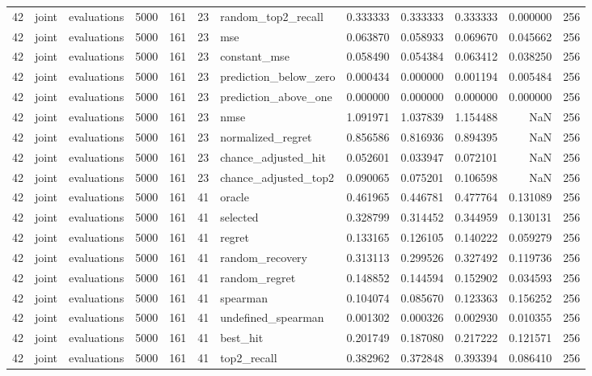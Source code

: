 \begin{tabular}{rllrrrlrrrrr}
42 & joint & evaluations & 5000 & 161 & 23 & random_top2_recall & 0.333333 & 0.333333 & 0.333333 & 0.000000 & 256 \\
42 & joint & evaluations & 5000 & 161 & 23 & mse & 0.063870 & 0.058933 & 0.069670 & 0.045662 & 256 \\
42 & joint & evaluations & 5000 & 161 & 23 & constant_mse & 0.058490 & 0.054384 & 0.063412 & 0.038250 & 256 \\
42 & joint & evaluations & 5000 & 161 & 23 & prediction_below_zero & 0.000434 & 0.000000 & 0.001194 & 0.005484 & 256 \\
42 & joint & evaluations & 5000 & 161 & 23 & prediction_above_one & 0.000000 & 0.000000 & 0.000000 & 0.000000 & 256 \\
42 & joint & evaluations & 5000 & 161 & 23 & nmse & 1.091971 & 1.037839 & 1.154488 & NaN & 256 \\
42 & joint & evaluations & 5000 & 161 & 23 & normalized_regret & 0.856586 & 0.816936 & 0.894395 & NaN & 256 \\
42 & joint & evaluations & 5000 & 161 & 23 & chance_adjusted_hit & 0.052601 & 0.033947 & 0.072101 & NaN & 256 \\
42 & joint & evaluations & 5000 & 161 & 23 & chance_adjusted_top2 & 0.090065 & 0.075201 & 0.106598 & NaN & 256 \\
42 & joint & evaluations & 5000 & 161 & 41 & oracle & 0.461965 & 0.446781 & 0.477764 & 0.131089 & 256 \\
42 & joint & evaluations & 5000 & 161 & 41 & selected & 0.328799 & 0.314452 & 0.344959 & 0.130131 & 256 \\
42 & joint & evaluations & 5000 & 161 & 41 & regret & 0.133165 & 0.126105 & 0.140222 & 0.059279 & 256 \\
42 & joint & evaluations & 5000 & 161 & 41 & random_recovery & 0.313113 & 0.299526 & 0.327492 & 0.119736 & 256 \\
42 & joint & evaluations & 5000 & 161 & 41 & random_regret & 0.148852 & 0.144594 & 0.152902 & 0.034593 & 256 \\
42 & joint & evaluations & 5000 & 161 & 41 & spearman & 0.104074 & 0.085670 & 0.123363 & 0.156252 & 256 \\
42 & joint & evaluations & 5000 & 161 & 41 & undefined_spearman & 0.001302 & 0.000326 & 0.002930 & 0.010355 & 256 \\
42 & joint & evaluations & 5000 & 161 & 41 & best_hit & 0.201749 & 0.187080 & 0.217222 & 0.121571 & 256 \\
42 & joint & evaluations & 5000 & 161 & 41 & top2_recall & 0.382962 & 0.372848 & 0.393394 & 0.086410 & 256 \\

\end{tabular}
